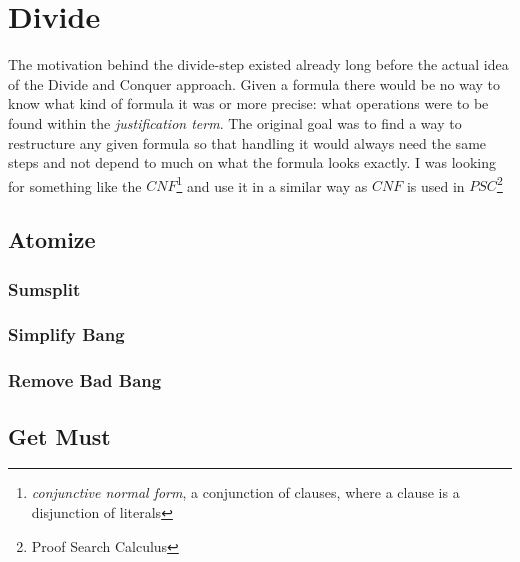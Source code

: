 \section{Divide}
The motivation behind the divide-step existed already long before the actual idea of the Divide and Conquer approach. Given a formula there would be no way to know what kind of formula it was or more precise: what operations were to be found within the \emph{justification term}. The original goal was to find a way to restructure any given formula so that handling it would always need the same steps and not depend to much on what the formula looks exactly. I was looking for something like the $CNF$\footnote{\emph{conjunctive normal form}, a conjunction of clauses, where a clause is a disjunction of literals} and use it in a similar way as $CNF$ is used in $PSC$\footnote{Proof Search Calculus}


\subsection{Atomize}
\subsubsection{Sumsplit}
\subsubsection{Simplify Bang}
\subsubsection{Remove Bad Bang}
\subsection{Get Must}
